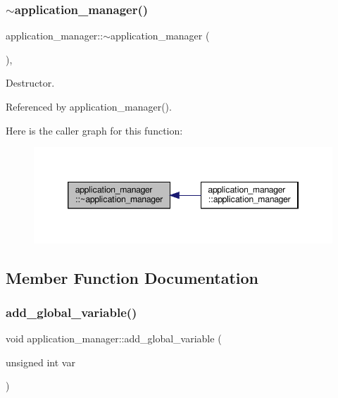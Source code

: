 \subsubsection{\texorpdfstring{$\sim$application\+\_\+manager()}{~application\_manager()}}
{\footnotesize\ttfamily application\+\_\+manager\+::$\sim$application\+\_\+manager (\begin{DoxyParamCaption}{ }\end{DoxyParamCaption})\hspace{0.3cm}{\ttfamily [virtual]}, {\ttfamily [default]}}



Destructor. 



Referenced by application\+\_\+manager().

Here is the caller graph for this function\+:
\nopagebreak
\begin{figure}[H]
\begin{center}
\leavevmode
\includegraphics[width=346pt]{dc/db5/classapplication__manager_a36adbbeba0486764f0765cf417e45c7a_icgraph}
\end{center}
\end{figure}


\subsection{Member Function Documentation}
\mbox{\label{classapplication__manager_a953bb946a20470c15bb25dc6fa820686}} 
\subsubsection{\texorpdfstring{add\+\_\+global\+\_\+variable()}{add\_global\_variable()}}
{\footnotesize\ttfamily void application\+\_\+manager\+::add\+\_\+global\+\_\+variable (\begin{DoxyParamCaption}\item[{unsigned int}]{var }\end{DoxyParamCaption})}



